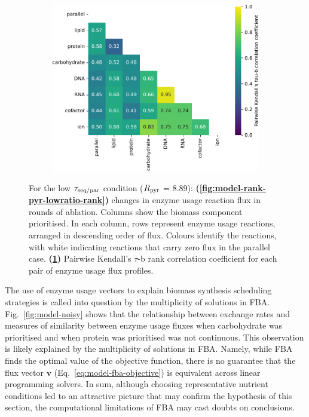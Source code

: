 \begin{figure}
\begin{subfigure}[t]{0.45\textwidth}
    \includegraphics[width=\linewidth]{CompareEnzUse_glc00p00_pyr08p89_ammUnres_2.pdf}
    \caption{
    }
    \label{fig:model-rank-pyr-lowratio-kendall}
  \end{subfigure}

  \caption[
    Changes in enzyme usage reaction flux and Kendall's $\tau$-b rank correlation coefficient for each pair, $\exchrate{pyr}$ = \SI{8.89}{\mmolgdwh}.
  ]{
    For the low $\tau_{\mathrm{seq}/\mathrm{par}}$ condition ($\exchrate{pyr}$ = \SI{8.89}{\mmolgdwh}):
    \textbf{(\ref{fig:model-rank-pyr-lowratio-rank})}
    changes in enzyme usage reaction flux in rounds of ablation.
    Columns show the biomass component prioritised.
    In each column, rows represent enzyme usage reactions, arranged in descending order of flux.
    Colours identify the reactions, with white indicating reactions that carry zero flux in the parallel case.
    \textbf{(\ref{fig:model-rank-pyr-lowratio-kendall})}
    Pairwise Kendall's $\tau$-b rank correlation coefficient \parencite{kendallTREATMENTTIESRANKING1945} for each pair of enzyme usage flux profiles.
  }
  \label{fig:model-rank-pyr-lowratio}
\end{figure}

The use of enzyme usage vectors to explain biomass synthesis scheduling strategies is called into question by the multiplicity of solutions in FBA.
Fig.\ \ref{fig:model-noisy} shows that the relationship between exchange rates and measures of similarity between enzyme usage fluxes when carbohydrate was prioritised and when protein was prioritised was not continuous.
This observation is likely explained by the multiplicity of solutions in FBA.
Namely, while FBA finds the optimal value of the objective function, there is no guarantee that the flux vector $\mathbf{v}$ (Eq.\ \ref{eq:model-fba-objective}) is equivalent across linear programming solvers.
In sum, although choosing representative nutrient conditions led to an attractive picture that may confirm the hypothesis of this section, the computational limitations of FBA may cast doubts on conclusions.

